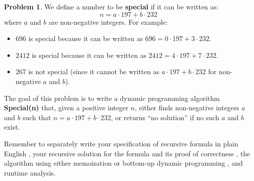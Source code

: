 \documentclass{article}
\theoremstyle{definition}
\newtheorem{problem}{Problem}
\begin{document}
\newpage

\begin{problem}
  We define a number to be \textbf{special} if it can be written as:
  \[
    n = a \cdot 197 + b \cdot 232
  \]
  where \(a\) and \(b\) are non-negative integers. For example:
  \begin{itemize}
    \item \(696\) is special because it can be written as \(696 = 0 \cdot 197 + 3 \cdot 232\).
    \item \(2412\) is special because it can be written as \(2412 = 4 \cdot 197 + 7 \cdot 232\).
    \item \(267\) is not special (since it cannot be written as \(a \cdot 197 + b \cdot 232\) for non-negative \(a\) and \(b\)).
  \end{itemize}

  The goal of this problem is to write a dynamic programming algorithm \textbf{Special(n)} that, given a positive integer \(n\), either finds non-negative integers \(a\) and \(b\) such that \(n = a \cdot 197 + b \cdot 232\), or returns “no solution” if no such \(a\) and \(b\) exist.

  Remember to separately write your specification of recursive formula in plain English , your recursive solution for the formula and its proof of correctness , the algorithm using either memoization or bottom-up dynamic programming , and runtime analysis.

\end{problem}
\end{document}
